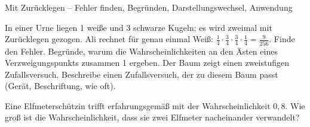 \begin{aufgabe}{Mit Zurücklegen – Fehler finden, Begründen, Darstellungswechsel, Anwendung}
\begin{teile}
\teil In einer Urne liegen 1 weiße und 3 schwarze Kugeln; es wird zweimal mit Zurücklegen gezogen. Ali rechnet für genau einmal Weiß: $\frac{1}{4} \cdot \frac{3}{4} \cdot \frac{3}{4} \cdot \frac{1}{4} = \frac{9}{256}$. Finde den Fehler.
\teil Begründe, warum die Wahrscheinlichkeiten an den Ästen eines Verzweigungspunkts zusammen 1 ergeben.
\teil Der Baum zeigt einen zweistufigen Zufallsversuch. Beschreibe einen Zufallsversuch, der zu diesem Baum passt (Gerät, Beschriftung, wie oft).

\teil Eine Elfmeterschützin trifft erfahrungsgemäß mit der Wahrscheinlichkeit $0{,}8$. Wie groß ist die Wahrscheinlichkeit, dass sie zwei Elfmeter nacheinander verwandelt?
\end{teile}
\end{aufgabe}
